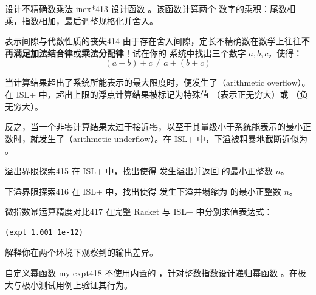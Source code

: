 \begin{exercise}{设计不精确数乘法 inex*}{413}
设计函数 。该函数计算两个  数字的乘积：尾数相乘，指数相加，最后调整规格化并舍入。
\end{exercise}

\begin{exercise}{表示间隙与代数性质的丧失}{414}
由于存在舍入间隙，定长不精确数在数学上往往\textbf{不再满足加法结合律}或\textbf{乘法分配律}！试在你的  系统中找出三个数字 $a, b, c$，使得：
\[
(a + b) + c \neq a + (b + c)
\]
\end{exercise}

\label{sec:int4_overflow_underflow}

当计算结果超出了系统所能表示的最大限度时，便发生了（arithmetic overflow）。在 ISL+ 中，超出上限的浮点计算结果被标记为特殊值 （表示正无穷大）或 （负无穷大）。

反之，当一个非零计算结果太过于接近零，以至于其量级小于系统能表示的最小正数时，就发生了（arithmetic underflow）。在 ISL+ 中，下溢被粗暴地截断近似为 。

\begin{exercise}{溢出界限探索}{415}
在 ISL+ 中，找出使得  发生溢出并返回  的最小正整数 $n$。
\end{exercise}

\begin{exercise}{下溢界限探索}{416}
在 ISL+ 中，找出使得  发生下溢并塌缩为  的最小正整数 $n$。
\end{exercise}

\begin{exercise}{微指数幂运算精度对比}{417}
在完整 Racket 与 ISL+ 中分别求值表达式：
\begin{lstlisting}[language=BSL]
(expt 1.001 1e-12)
\end{lstlisting}
解释你在两个环境下观察到的输出差异。
\end{exercise}

\begin{exercise}{自定义幂函数 my-expt}{418}
不使用内置的 ，针对整数指数设计递归幂函数 。在极大与极小测试用例上验证其行为。
\end{exercise}

\label{sec:int4_cancellation}

